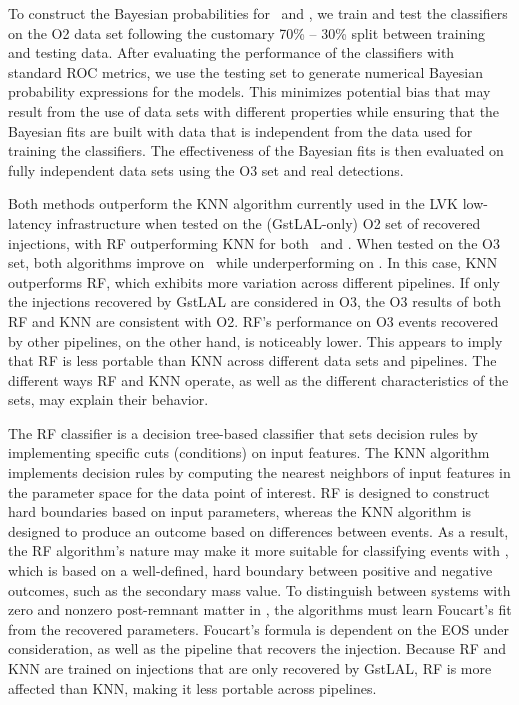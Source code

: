 To construct the Bayesian probabilities for \hasns\ and \hasrem, we train and test the classifiers on the \ac{O2} data set following the customary 70\% -- 30\% split between
training and testing data. After evaluating the performance of the classifiers with standard \ac{ROC} metrics, we use the testing set to generate numerical Bayesian probability
expressions for the models. This minimizes potential bias that may result from the use of data sets with different properties while ensuring that the Bayesian fits are built with
data that is independent from the data used for training the classifiers. The effectiveness of the Bayesian fits is then evaluated on fully independent data sets using the
\ac{O3} set and real detections. 


Both methods outperform the \ac{KNN} algorithm currently used in the \ac{LVK} low-latency infrastructure when tested on the (GstLAL-only) \ac{O2} set of recovered injections, with
\ac{RF} outperforming \ac{KNN} for both \hasns\ and \hasrem. When tested on the \ac{O3} set, both algorithms improve on \hasns\ while underperforming on \hasrem.  In this case,
\ac{KNN} outperforms \ac{RF}, which exhibits more variation across different pipelines.  If only the injections recovered by GstLAL are considered in \ac{O3}, the \ac{O3} results of
both \ac{RF} and \ac{KNN} are consistent with \ac{O2}. \ac{RF}'s performance on \ac{O3} events recovered by other pipelines, on the other hand, is noticeably lower. This appears to
imply that \ac{RF} is less portable than \ac{KNN} across different data sets and pipelines. The different ways \ac{RF} and \ac{KNN} operate, as well as the different characteristics
of the sets, may explain their behavior.

The RF classifier is a decision tree-based classifier that sets decision rules by implementing specific cuts (conditions) on input features. The \ac{KNN} algorithm implements decision rules by computing the nearest neighbors of input features in the parameter space for the data point of interest. \ac{RF} is designed to construct hard boundaries based on input parameters, whereas the \ac{KNN} algorithm is designed to produce an outcome based on differences between events. As a result, the \ac{RF} algorithm's nature may make it more suitable for classifying events with \hasns, which is based on a well-defined, hard boundary between positive and negative outcomes, such as the secondary mass value. To distinguish between systems with zero and nonzero post-remnant matter in \hasrem, the algorithms must learn Foucart's fit from the recovered parameters. Foucart's formula is dependent on the \ac{EOS} under consideration, as well as the pipeline that recovers the injection. Because \ac{RF} and \ac{KNN} are trained on injections that are only recovered by GstLAL, \ac{RF} is more affected than \ac{KNN}, making it less portable across pipelines.

